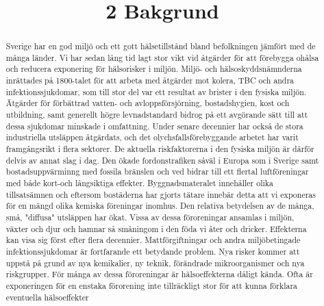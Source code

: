 \title{
2 Bakgrund
}
\begin{abstract}
Sverige har en god miljö och ett gott hälsetillstånd bland befolkningen jämfört med de många länder. Vi har sedan lång tid lagt stor vikt vid åtgärder för att förebygga ohålsa och reducera exponering för hälsorisker i miljön. Miljö- och hälsoskyddsnämnderna inrättades på 1800-talet för att arbeta med åtgärder mot kolera, TBC och andra infektionssjukdomar, som till stor del var ett resultat av brister i den fysiska miljön. Ätgärder för förbättrad vatten- och avloppsförsjörning, bostadshygien, kost och utbildning, samt generellt högre levnadstandard bidrog på ett avgörande sätt till att dessa sjukdomar minskade i omfattning. Under senare decennier har också de stora industriella utsläppen åtgärdats, och det olychsfallsförebyggande arbetet har varit framgångsrikt i flera sektorer.
De aktuella riskfaktorerna i den fysiska miljön är därför delvis av annat slag i dag. Den ökade fordonstrafiken såväl i Europa som i Sverige samt bostadsuppvärminng med fossila bränslen och ved bidrar till ett flertal luftföreningar med både kort-och långsiktiga effekter. Byggnadsmateralet innehåller olika tillsatsämnen och eftersom bostäderna har gjorts tätare innebär detta att vi exponeras för en mängd olika kemiska föreningar inomhus. Den relativa betydelsen av de många, små, "diffusa" utsläppen har ökat. Vissa av dessa föroreningar ansamlas i miljön, växter och djur och hamnar så småningom i den föda vi åter och dricker. Effekterna kan visa sig först efter flera decennier. Mattförgiftningar och andra miljöbetingade infektionssjukdomar är fortfarande ett betydande problem. Nya risker kommer att uppstå på grund av nya kemikalier, ny teknik, förändrade mikroorganismer och nya riskgrupper.
För många av dessa föroreningar är hälsoeffekterna dåligt kända. Ofta är exponeringen för en enstaka förorening inte tillräckligt stor för att kunna förklara eventuella hälsoeffekter
\end{abstract}

